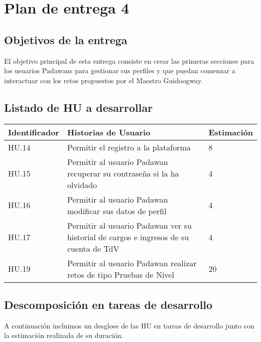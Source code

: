 \section{Plan de entrega 4}

\subsection{Objetivos de la entrega}

El objetivo principal de esta entrega consiste en crear las primeras secciones para los usuarios Padawans para gestionar sus perfiles y que puedan comenzar a interactuar con los retos propuestos por el Maestro Guidoogway.

\subsection{Listado de HU a desarrollar}

\begin{table}[h]
	\centering
	\begin{tabular}{| p{2.3cm} | p{6.7cm} | p{2cm} |}
		\rowcolor[HTML]{329A9D} 
		{\color[HTML]{FFFFFF} \textbf{Identificador}} & {\color[HTML]{FFFFFF} \textbf{Historias de Usuario}} & {\color[HTML]{FFFFFF} \textbf{Estimación}}  \\ \hline
		HU.14 & Permitir el registro a la plataforma & 8 \\ \hline
		HU.15 & Permitir al usuario Padawan recuperar su contraseña si la ha olvidado & 4 \\ \hline
		HU.16 & Permitir al usuario Padawan modificar sus datos de perfil & 4 \\ \hline
		HU.17 & Permitir al usuario Padawan ver su historial de cargos e ingresos de su cuenta de TdV & 4 \\ \hline
		HU.19 & Permitir al usuario Padawan realizar retos de tipo Pruebas de Nivel & 20 \\ \hline
	\end{tabular}
\end{table}

\newpage

\subsection{Descomposición en tareas de desarrollo}

A continuación incluimos un desglose de las HU en tareas de desarrollo junto con la estimación realizada de su duración.\\

